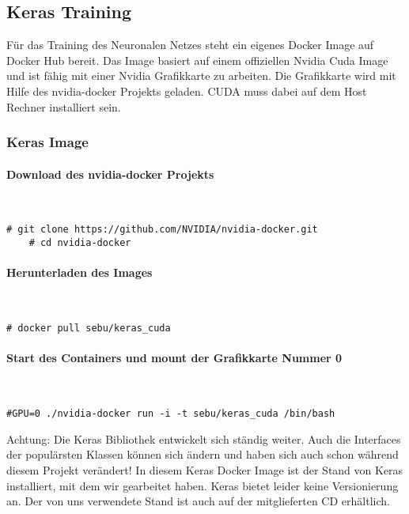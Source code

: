 \subsection{Keras Training}
Für das Training des Neuronalen Netzes steht ein eigenes Docker Image \cite{DokerKeras} auf Docker Hub bereit. Das Image basiert auf einem offiziellen Nvidia Cuda Image und ist fähig mit einer Nvidia Grafikkarte zu arbeiten. Die Grafikkarte wird mit Hilfe des nvidia-docker Projekts geladen. CUDA muss dabei auf dem Host Rechner installiert sein.


\subsubsection{Keras Image}
\paragraph{Download des nvidia-docker Projekts}\mbox{}\\
\begin{lstlisting}[style=BashInputStyle]
	# git clone https://github.com/NVIDIA/nvidia-docker.git
	# cd nvidia-docker
\end{lstlisting}

\paragraph{Herunterladen des Images}\mbox{}\\
\begin{lstlisting}[style=BashInputStyle]
	# docker pull sebu/keras_cuda
\end{lstlisting}	

\paragraph{Start des Containers und mount der Grafikkarte Nummer 0}\mbox{}\\
\begin{lstlisting}[style=BashInputStyle]
	#GPU=0 ./nvidia-docker run -i -t sebu/keras_cuda /bin/bash
\end{lstlisting}

Achtung: Die Keras Bibliothek entwickelt sich ständig weiter. Auch die Interfaces der populärsten Klassen können sich ändern und haben sich auch schon während diesem Projekt verändert! In diesem Keras Docker Image ist der Stand von Keras installiert, mit dem wir gearbeitet haben. Keras bietet leider keine Versionierung an. Der von uns verwendete Stand ist auch auf der mitglieferten CD erhältlich.

